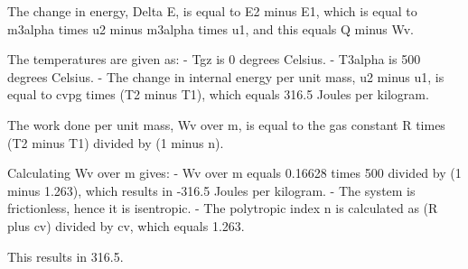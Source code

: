 The change in energy, Delta E, is equal to E2 minus E1, which is equal to m3alpha times u2 minus m3alpha times u1, and this equals Q minus Wv.

The temperatures are given as:
- Tgz is 0 degrees Celsius.
- T3alpha is 500 degrees Celsius.
- The change in internal energy per unit mass, u2 minus u1, is equal to cvpg times (T2 minus T1), which equals 316.5 Joules per kilogram.

The work done per unit mass, Wv over m, is equal to the gas constant R times (T2 minus T1) divided by (1 minus n).

Calculating Wv over m gives:
- Wv over m equals 0.16628 times 500 divided by (1 minus 1.263), which results in -316.5 Joules per kilogram.
- The system is frictionless, hence it is isentropic.
- The polytropic index n is calculated as (R plus cv) divided by cv, which equals 1.263.

This results in 316.5.